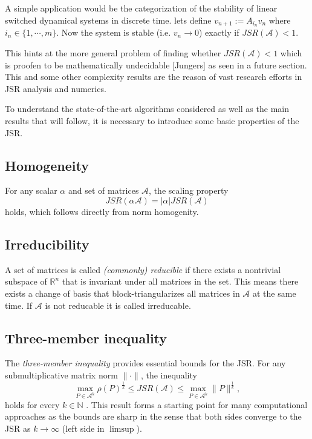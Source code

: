 A simple application would be the categorization of the stability of linear switched dynamical systems in discrete time. 
lets define $v_{n+1} := A_{i_n}v_{n}$ where $i_n \in \{1, \cdots , m\}$. Now the system is stable (i.e. $v_n \rightarrow 0$) exactly if $JSR(\mathcal{A}) < 1$.

This hints at the more general problem of finding whether $JSR(\mathcal{A}) < 1$ which is proofen to be mathematically undecidable [Jungers] as seen in a future section. This and some other complexity results are the reason of vast research efforts in JSR analysis and numerics. 

To understand the state-of-the-art algorithms considered as well as the main results that will follow, it is necessary to introduce some basic properties of the JSR.

\subsection*{Homogeneity}
For any scalar $\alpha$ and set of matrices $\mathcal{A}$, the scaling property
\begin{equation}
    JSR(\alpha \mathcal{A}) = |\alpha| JSR(\mathcal{A})
\end{equation}
holds, which follows directly from norm homogenity. 

\subsection*{Irreducibility}
A set of matrices is called \emph{(commonly) reducible} if there exists a nontrivial subspace of $\mathbb{R}^n$ that is invariant under all matrices in the set. This means there exists a change of basis that block-triangularizes all matrices in $\mathcal{A}$ at the same time. If $\mathcal{A}$ is not reducable it is called irreducable. 

\subsection*{Three-member inequality}
The \emph{three-member inequality} provides essential bounds for the JSR. For any submultiplicative matrix norm $\|\cdot\|$, the inequality
\begin{equation}
    \max_{P \in \mathcal{A}^k} \rho(P)^{\frac{1}{k}} \leq JSR(\mathcal{A}) \leq \max_{P \in \mathcal{A}^k} \| P\|^{\frac{1}{k}},
    \label{eq:three-member}
\end{equation}
holds for every $k \in \mathbb{N}$ \citep{jungersJointSpectralRadius2009}. This result forms a starting point for many computational approaches as the bounds are sharp in the sense that both sides converge to the JSR as $k\rightarrow \infty$ (left side in $\limsup$).

